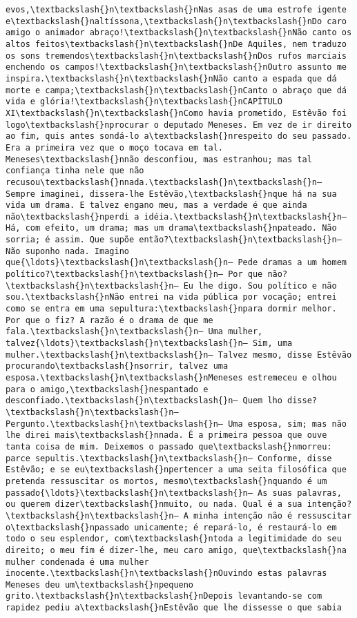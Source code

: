 \begin{Verbatim}[commandchars=\\\{\}]
evos,\textbackslash{}n\textbackslash{}nNas asas de uma estrofe igente e\textbackslash{}naltíssona,\textbackslash{}n\textbackslash{}nDo caro amigo o animador abraço!\textbackslash{}n\textbackslash{}nNão canto os altos feitos\textbackslash{}n\textbackslash{}nDe Aquiles, nem traduzo os sons tremendos\textbackslash{}n\textbackslash{}nDos rufos marciais enchendo os campos!\textbackslash{}n\textbackslash{}nOutro assunto me inspira.\textbackslash{}n\textbackslash{}nNão canto a espada que dá morte e campa;\textbackslash{}n\textbackslash{}nCanto o abraço que dá vida e glória!\textbackslash{}n\textbackslash{}nCAPÍTULO XI\textbackslash{}n\textbackslash{}nComo havia prometido, Estêvão foi logo\textbackslash{}nprocurar o deputado Meneses. Em vez de ir direito ao fim, quis antes sondá-lo a\textbackslash{}nrespeito do seu passado. Era a primeira vez que o moço tocava em tal. Meneses\textbackslash{}nnão desconfiou, mas estranhou; mas tal confiança tinha nele que não recusou\textbackslash{}nnada.\textbackslash{}n\textbackslash{}n— Sempre imaginei, dissera-lhe Estêvão,\textbackslash{}nque há na sua vida um drama. E talvez engano meu, mas a verdade é que ainda não\textbackslash{}nperdi a idéia.\textbackslash{}n\textbackslash{}n— Há, com efeito, um drama; mas um drama\textbackslash{}npateado. Não sorria; é assim. Que supõe então?\textbackslash{}n\textbackslash{}n— Não suponho nada. Imagino que{\ldots}\textbackslash{}n\textbackslash{}n— Pede dramas a um homem político?\textbackslash{}n\textbackslash{}n— Por que não?\textbackslash{}n\textbackslash{}n— Eu lhe digo. Sou político e não sou.\textbackslash{}nNão entrei na vida pública por vocação; entrei como se entra em uma sepultura:\textbackslash{}npara dormir melhor. Por que o fiz? A razão é o drama de que me fala.\textbackslash{}n\textbackslash{}n— Uma mulher, talvez{\ldots}\textbackslash{}n\textbackslash{}n— Sim, uma mulher.\textbackslash{}n\textbackslash{}n— Talvez mesmo, disse Estêvão procurando\textbackslash{}nsorrir, talvez uma esposa.\textbackslash{}n\textbackslash{}nMeneses estremeceu e olhou para o amigo,\textbackslash{}nespantado e desconfiado.\textbackslash{}n\textbackslash{}n— Quem lho disse?\textbackslash{}n\textbackslash{}n— Pergunto.\textbackslash{}n\textbackslash{}n— Uma esposa, sim; mas não lhe direi mais\textbackslash{}nnada. É a primeira pessoa que ouve tanta coisa de mim. Deixemos o passado que\textbackslash{}nmorreu: parce sepultis.\textbackslash{}n\textbackslash{}n— Conforme, disse Estêvão; e se eu\textbackslash{}npertencer a uma seita filosófica que pretenda ressuscitar os mortos, mesmo\textbackslash{}nquando é um passado{\ldots}\textbackslash{}n\textbackslash{}n— As suas palavras, ou querem dizer\textbackslash{}nmuito, ou nada. Qual é a sua intenção?\textbackslash{}n\textbackslash{}n— A minha intenção não é ressuscitar o\textbackslash{}npassado unicamente; é repará-lo, é restaurá-lo em todo o seu esplendor, com\textbackslash{}ntoda a legitimidade do seu direito; o meu fim é dizer-lhe, meu caro amigo, que\textbackslash{}na mulher condenada é uma mulher inocente.\textbackslash{}n\textbackslash{}nOuvindo estas palavras Meneses deu um\textbackslash{}npequeno grito.\textbackslash{}n\textbackslash{}nDepois levantando-se com rapidez pediu a\textbackslash{}nEstêvão que lhe dissesse o que sabia 
\end{Verbatim}
